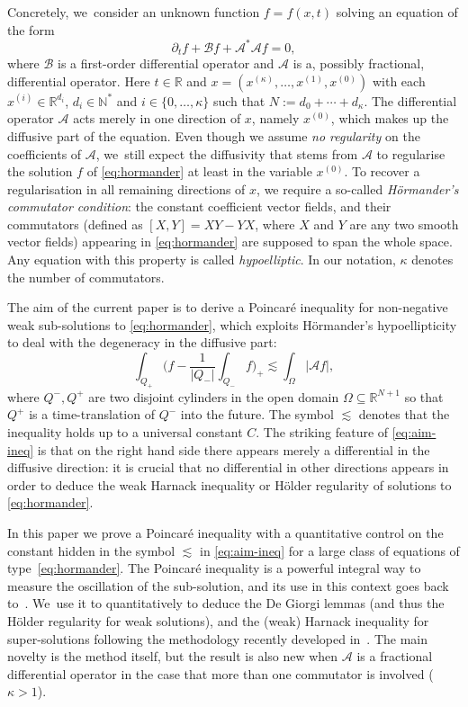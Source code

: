 \documentclass[JEP,XML,SOM,Unicode,NoFloatCountersInSection,published]{cedram}
\theoremstyle{definition}
\newcommand\N{{\mathbb N}}
\newcommand\R{{\mathbb R}}
\newcommand{\cA}{{\mathcal A}}
\newcommand{\cB}{{\mathcal B}}
\begin{document}
Concretely, we~consider an unknown function $f=f(x,t)$ solving an equation of the form
\begin{equation}
\label{eq:hormander}
\partial_t f + \cB f + \cA^* \cA f =0,
\end{equation}
where $\cB$ is a first-order differential operator and
$\cA$ is a, possibly fractional, differential operator.
Here $t \in \R$ and $x=(x^{(\kappa)},\dots,x^{(1)},x^{(0)})$
with each
$x^{(i)} \in \R^{d_i}$, $d_i \in \N^*$ and
$i \in \{0,\dots,\kappa\}$ such that
$N:=d_0+\cdots+d_\kappa$. The differential operator $\cA$ acts merely in one direction of $x$, namely $x^{(0)}$,
which makes up the diffusive part of the equation.
Even though we assume \textit{no regularity} on the coefficients of $\cA$, we~still expect the diffusivity that stems from $\cA$ to regularise the
solution $f$ of \eqref{eq:hormander} at least in the variable $x^{(0)}$. To recover a regularisation in all remaining directions of $x$,
we require a so-called \textit{Hörmander's commutator condition}: the constant coefficient vector fields, and their commutators
(defined as $[X, Y] = XY - YX$, where $X$ and $Y$ are any two smooth vector fields) appearing in \eqref{eq:hormander} are supposed
to span the whole space. Any equation with this property is called \textit{hypoelliptic}. In our notation, $\kappa$ denotes the number of commutators.

The aim of the current paper is to derive a Poincaré inequality for non-negative weak sub-solutions to \eqref{eq:hormander},
which exploits Hörmander's hypoellipticity to deal with the degeneracy in the diffusive part:
\begin{equation}\label{eq:aim-ineq}
\int_{Q_+} \biggl(f - \frac{1}{|Q_-|} \int_{Q_-} f
\biggr)_+ \lesssim \int_\Omega |\cA f|,
\end{equation}
where $Q^-,Q^+$ are two disjoint cylinders in the open domain
$\Omega \subseteq \mathbb{R}^{N+1}$ so that $Q^+$ is a time-translation of $Q^-$ into the
future. The symbol $\lesssim$ denotes that the inequality holds up to a universal constant $C$.
The striking feature of \eqref{eq:aim-ineq} is that on the right hand side there appears merely a differential in the diffusive direction: it is crucial that no differential in other directions appears in order to deduce the weak Harnack inequality or Hölder regularity of solutions to \eqref{eq:hormander}.

In this paper we prove a Poincaré inequality with a
quantitative control on the constant hidden in the symbol $\lesssim$ in \eqref{eq:aim-ineq} for a large class of
equations of type~\eqref{eq:hormander}.
The Poincaré inequality is a
powerful integral way to measure the oscillation of the
sub-solution, and its use in this context goes back
to~\cite{nash,moser}. We~use it to quantitatively to deduce the De Giorgi
lemmas (and thus the Hölder regularity for weak solutions), and the (weak)
Harnack inequality for super-solutions following the methodology
recently developed
in~\cite{guerand-mouhot,loher-2022-preprint-quantitative-de-giorgi}. The main novelty is
the method itself, but the result is
also new when $\mathcal A$ is a fractional differential operator in the case that more than one commutator is
involved (\ie $\kappa > 1$).
\end{document}
